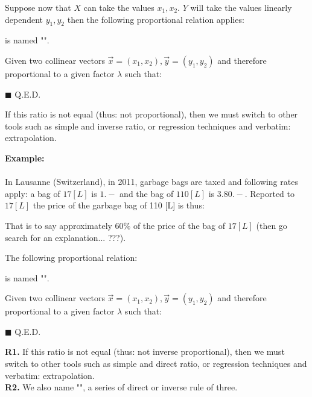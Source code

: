 \begin{theorem}
Suppose now that $X$ can take the values $x_1,x_2$. $Y$ will take  the values linearly dependent $y_1,y_2$ then the following proportional relation applies:
	
is named "".
\end{theorem}
\begin{dem}
	Given two collinear vectors $\vec{x}=(x_1,x_2),\vec{y}=(y_1,y_2)$ and therefore proportional to a given factor $\lambda$ such that:
	
	\begin{flushright}
		$\blacksquare$  Q.E.D.
	\end{flushright}
\end{dem}
	\begin{tcolorbox}[title=Remarks,colframe=black,arc=10pt]
If this ratio is not equal (thus: not proportional), then we must switch to other tools such as simple and inverse ratio, or regression techniques and verbatim: extrapolation.
	\end{tcolorbox}	
	\begin{tcolorbox}[colframe=black,colback=white,sharp corners]
\textbf{{\Large {}}Example:}\\\\
In Lausanne (Switzerland), in 2011, garbage bags are taxed and following rates apply: a bag of $17 [L]$ is $1.-$ and the bag of $110 [L]$ is $3.80.-$. Reported to $17 [L]$ the price of the garbage bag of 110 [L] is thus:
	
That is to say approximately $60\%$ of the price of the bag of $17 [L]$ (then go search for an explanation... ???).
	\end{tcolorbox}
\begin{theorem}
The following proportional relation:
	
is named "".
\end{theorem}
\begin{dem}
	Given two collinear vectors $\vec{x}=(x_1,x_2),\vec{y}=(y_1,y_2)$ and therefore proportional to a given factor $\lambda$ such that:
	
	\begin{flushright}
		$\blacksquare$  Q.E.D.
	\end{flushright}
\end{dem}
	\begin{tcolorbox}[title=Remark,colframe=black,arc=10pt]
\textbf{R1. }If this ratio is not equal (thus: not inverse proportional), then we must switch to other tools such as simple and direct ratio, or regression techniques and verbatim: extrapolation.\\
\textbf{R2.} We also name "", a series of direct or inverse rule of three.
	\end{tcolorbox}	

